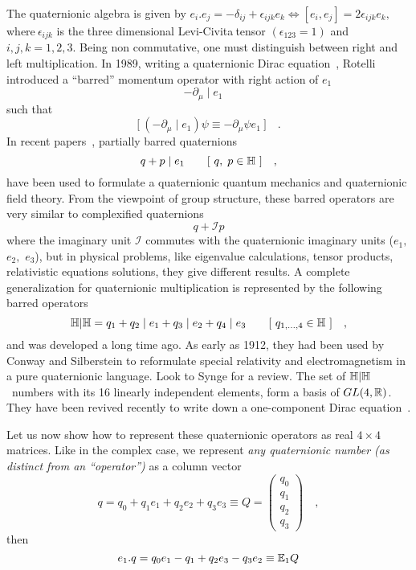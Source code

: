 \documentclass[a4paper,12pt]{book}
\begin{document}
The quaternionic algebra is given by $e_{i}.e_{j}=-\delta _{ij}+\epsilon
_{ijk}e_{k}\Longleftrightarrow \left[ e_{i},e_{j}\right] =2\epsilon
_{ijk}e_{k},$ where$\ \epsilon _{ijk}$ is the three dimensional Levi-Civita$%
\ $tensor $\left( \epsilon _{123}=1\right) $ and $i,j,k=1,2,3$. Being non
commutative, one must distinguish between right and left multiplication. In
1989, writing a quaternionic Dirac equation~\cite{rot}, Rotelli introduced a
``barred'' momentum operator with right action of $e_{1}$ 
\begin{equation}
-\partial _{\mu }\mid e_{1}\quad
\end{equation}
such that 
\begin{equation}
\lbrack ~(-\partial _{\mu }\mid e_{1})\psi \equiv -\partial _{\mu }\psi
e_{1}~]\quad .
\end{equation}
In recent papers~\cite{deleos}, partially barred quaternions 
\begin{equation}
q+p\mid e_{1}\quad \quad [~q,\;p\in \Bbb{H}~]\quad ,
\end{equation}
have been used to formulate a quaternionic quantum mechanics and
quaternionic field theory. From the viewpoint of group structure, these
barred operators are very similar to complexified quaternions~\cite{morita} 
\begin{equation}
q+\mathcal{I}p
\end{equation}
where the imaginary unit $\mathcal{I}$ commutes with the quaternionic
imaginary units ($e_{1},$ $e_{2},$ $e_{3}$), but in physical problems, like
eigenvalue calculations, tensor products, relativistic equations solutions,
they give different results. A complete generalization for quaternionic
multiplication is represented by the following barred operators 
\begin{equation}
\Bbb{H}|\Bbb{H}=q_{1}+q_{2}\mid e_{1}+q_{3}\mid e_{2}+q_{4}\mid e_{3}\quad
\quad [~q_{1,...,4}\in \Bbb{H}~]\quad ,  \label{gen1}
\end{equation}
and was developed a long time ago. As early as 1912, they had been used by
Conway and Silberstein \cite{conway}\cite{silberstein} to reformulate
special relativity and electromagnetism in a pure quaternionic language.
Look to Synge \cite{synge} for a review. The set of $\Bbb{H}|\Bbb{H}$ \
numbers with its 16 linearly independent elements, form a basis of $GL(4,%
\Bbb{R})$. They have been revived recently to write down a one-component
Dirac equation~\cite{deleos2}.

Let us now show how to represent these quaternionic operators as real $%
4\times 4$ matrices. Like in the complex case, we represent \emph{any
quaternionic number (as distinct from an ``operator'') } as a column vector 
\[
q=q_{0}+q_{1}e_{1}+q_{2}e_{2}+q_{3}e_{3}\equiv Q=\left( 
\begin{array}{c}
q_{0} \\ 
q_{1} \\ 
q_{2} \\ 
q_{3}
\end{array}
\right) \quad , 
\]
then 
\begin{equation}
e_{1}.q=q_{0}e_{1}-q_{1}+q_{2}e_{3}-q_{3}e_{2}\equiv \Bbb{E}_{1}Q
\end{equation}
\end{document}
